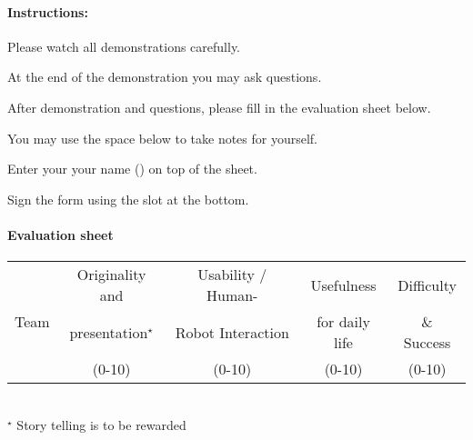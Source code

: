 \paragraph{Instructions:}
\begin{compactenum}
\item Please watch all demonstrations carefully.
\item At the end of the demonstration you may ask questions.
\item After demonstration and questions, please fill in the evaluation sheet below.
\item You may use the space below  to take notes for yourself.
\item Enter your your name () on top of the sheet.
\item Sign the form using the  slot at the bottom.
\end{compactenum}


\paragraph{Evaluation sheet}
\begin{center}

\begingroup
\newcommand\tableTEAMS{}
\def\do#1{\appto\tableTEAMS{#1 & & & &  \\\hline}}%
\expandafter\docsvlist\expandafter{\TEAMSFINALS}

\begin{tabular}{|l|c|c|c|c|}
  \hline
  \multirow{3}{*}{Team}
  & Originality and        &  Usability / Human-  &  Usefulness      & Difficulty  \\
  & presentation${}^\star$ & Robot Interaction    &  for daily life  & \& Success  \\
  & (0-10)                 &  (0-10)              &  (0-10)          & (0-10) \\
  \hline
  \hline
  \tableTEAMS
\end{tabular}\\
${}^\star$ Story telling is to be rewarded
\endgroup
\end{center}

